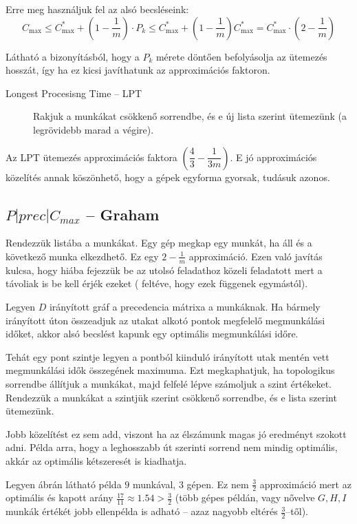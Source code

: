 Erre meg használjuk fel az alsó becsléseink:
\[
C_{\mbox{max}} \leq C^*_{\mbox{max}} + \left(1-\frac{1}{m}\right) \cdot P_k 
\leq C^*_{\mbox{max}} + \left(1-\frac{1}{m}\right) C^*_{\mbox{max}} 
=C^*_{\mbox{max}} \cdot \left(2-\frac{1}{m}\right)
\]

Látható a bizonyításból, hogy a $P_k$ mérete döntően befolyásolja az ütemezés
hosszát, így ha ez kicsi javíthatunk az approximációs faktoron. 
\begin{description}
  \item[Longest Procesisng Time -- LPT ] Rakjuk a munkákat csökkenő
  sorrendbe, és e új lista szerint ütemezünk (a legrövidebb marad a végire).
\end{description}
 
Az LPT ütemezés approximációs faktora $\left( \dfrac{4}{3} - \dfrac{1}{3m}
\right)$. E jó approximációs közelítés annak köszönhető, hogy a gépek egyforma
gyorsak, tudásuk azonos.

\subsection{ \texorpdfstring {$ P|prec|C_{max} $} {P|prec|Cmax} -- Graham}

Rendezzük listába a munkákat. Egy gép megkap egy munkát, ha áll és a következő
munka elkezdhető. Ez egy $2-\frac{1}{m}$ approximáció. Ezen való javítás kulcsa,
hogy hiába fejezzük be az utolsó feladathoz közeli feladatott mert a távoliak is
be kell érjék ezeket ( feltéve, hogy ezek függenek egymástól). 

Legyen $D$ irányított gráf a precedencia mátrixa a munkáknak. Ha bármely
irányított úton összeadjuk az utakat alkotó pontok megfelelő megmunkálási
időket, akkor alsó becslést kapunk egy optimális megmunkálási időre.

Tehát egy pont szintje legyen a pontból kiinduló irányított utak  mentén vett
megmunkálási idők összegének maximuma. Ezt megkaphatjuk, ha topologikus
sorrendbe állítjuk a munkákat, majd felfelé lépve számoljuk a szint értékeket.
Rendezzük a munkákat a szintjük szerint csökkenő sorrendbe, és e lista szerint
ütemezünk. 

Jobb közelítést ez sem add, viszont ha az élszámunk magas jó eredményt szokott
adni. Példa arra, hogy a leghosszabb út szerinti sorrend nem mindig optimális,
akkár az optimális kétszeresét is kiadhatja.

Legyen  ábrán látható példa $9$ munkával, $3$ gépen. Ez nem
$\frac{3}{2}$ approximáció mert az optimális és kapott arány $\frac{17}{11}
\approx 1.54 > \frac{3}{2}$ (több gépes példán, vagy nővelve $G,H,I$ munkák
értékét jobb ellenpélda is adható -- azaz nagyobb eltérés $\frac{3}{2}$--től).

